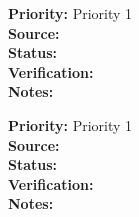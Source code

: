 




\begin{reqlist}
{\bf Priority:} Priority 1 \\
{\bf Source:}  \\
{\bf Status:}  \\
{\bf Verification:} \\
{\bf Notes:}  
\end{reqlist}

\begin{reqlist}
{\bf Priority:} Priority 1 \\
{\bf Source:}  \\
{\bf Status:}  \\
{\bf Verification:} \\
{\bf Notes:}  
\end{reqlist}





